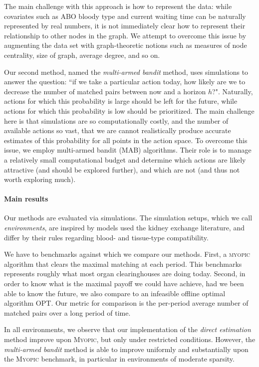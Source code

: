 \documentclass[format=acmsmall, review=false]{acmart}
\begin{document}
The main challenge with this approach is how to represent the data: while covariates such as ABO bloody type and current waiting time can be naturally represented by real numbers, it is not immediately clear how to represent their relationship to other nodes in the graph.  We attempt to overcome this issue by augmenting the data set with graph-theoretic notions such as measures of node centrality, size of graph, average degree, and so on. 

Our second method, named the \emph{multi-armed bandit} method, uses simulations to answer the question: ``if we take a particular action today, how likely are we to decrease the number of matched pairs between now and a horizon $h$?". Naturally, actions for which this probability is large should be left for the future, while actions for which this probability is low should be prioritized. The main challenge here is that simulations are so computationally costly, and the number of available actions so vast, that we are cannot realistically produce accurate estimates of this probability for all points in the action space. To overcome this issue, we employ multi-armed bandit (MAB) algorithms. Their role is to manage a relatively small computational budget and determine which actions are likely attractive (and should be explored further), and which are not (and thus not worth exploring much).


\paragraph{\textbf{Main results}} Our methods are evaluated via simulations. The simulation setups, which we call \emph{environments}, are inspired by models used the kidney exchange literature, and differ by their rules regarding blood- and tissue-type compatibility.

We have to benchmarks against which we compare our methods. First, a \textsc{myopic} algorithm that clears the maximal matching at each period. This benchmarks represents roughly what most organ clearinghouses are doing today. Second, in order to know what is the maximal payoff we could have achieve, had we been able to know the future, we also compare to an infeasible offline optimal algorithm \textsc{OPT}. Our metric for comparison is the per-period average number of matched pairs over a long period of time.

In all environments, we observe that our implementation of the \emph{direct estimation} method improve upon \textsc{Myopic}, but only under restricted conditions. However, the \emph{multi-armed bandit} method is able to improve uniformly and substantially upon the \textsc{Myopic} benchmark, in particular in environments of moderate sparsity.
\end{document}
